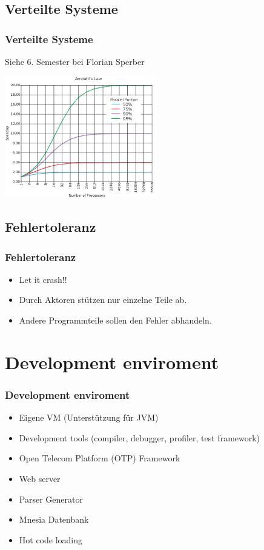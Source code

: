 \subsection{Verteilte Systeme}
\begin{frame} %
  \frametitle{Verteilte Systeme} %
    Siehe 6. Semester bei Florian Sperber
    \begin{center}
       \includegraphics[width=250px]{img/amdahl}
    \end{center}
\end{frame}

\subsection{Fehlertoleranz}
\begin{frame} %
  \frametitle{Fehlertoleranz} %
  \begin{itemize} %
    \item Let it crash!!
    \item Durch Aktoren stützen nur einzelne Teile ab.
    \item Andere Programmteile sollen den Fehler abhandeln.
  \end{itemize}
\end{frame}

\section{Development enviroment}
\begin{frame} %
  \frametitle{Development enviroment} %
  \begin{itemize} %
    \item Eigene VM (Unterstützung für JVM)
    \item Development tools (compiler, debugger, profiler, test framework)
    \item Open Telecom Platform (OTP) Framework
    \item Web server
    \item Parser Generator
    \item Mnesia Datenbank
    \item Hot code loading
  \end{itemize}
\end{frame}

